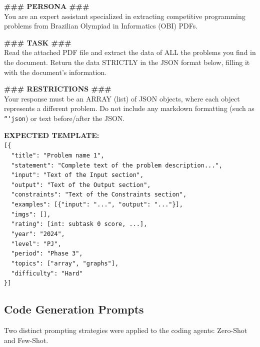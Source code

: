 \documentclass[conference]{IEEEtran}
\begin{document}
\begin{tcolorbox}[breakable, colframe=black!75, colback=black!5, title=\textbf{Prompt: Problem Extractor}]
\textbf{\#\#\# PERSONA \#\#\#}\\
You are an expert assistant specialized in extracting competitive programming problems from Brazilian Olympiad in Informatics (OBI) PDFs.

\textbf{\#\#\# TASK \#\#\#}\\
Read the attached PDF file and extract the data of ALL the problems you find in the document.
Return the data STRICTLY in the JSON format below, filling it with the document's information.

\textbf{\#\#\# RESTRICTIONS \#\#\#}\\
Your response must be an ARRAY (list) of JSON objects, where each object represents a different problem.
Do not include any markdown formatting (such as \texttt{```json}) or text before/after the JSON.

\textbf{EXPECTED TEMPLATE:}\\
\texttt{[\{}\\
\texttt{~~"title": "Problem name 1",}\\
\texttt{~~"statement": "Complete text of the problem description...",}\\
\texttt{~~"input": "Text of the Input section",}\\
\texttt{~~"output": "Text of the Output section",}\\
\texttt{~~"constraints": "Text of the Constraints section",}\\
\texttt{~~"examples": [\{"input": "...", "output": "..."\}],}\\
\texttt{~~"imgs": [],}\\
\texttt{~~"rating": [int: subtask 0 score, ...],}\\
\texttt{~~"year": "2024",}\\
\texttt{~~"level": "PJ",}\\
\texttt{~~"period": "Phase 3",}\\
\texttt{~~"topics": ["array", "graphs"],}\\
\texttt{~~"difficulty": "Hard"}\\
\texttt{\}]}
\end{tcolorbox}

\subsection{Code Generation Prompts}
Two distinct prompting strategies were applied to the coding agents: Zero-Shot and Few-Shot.
\end{document}
